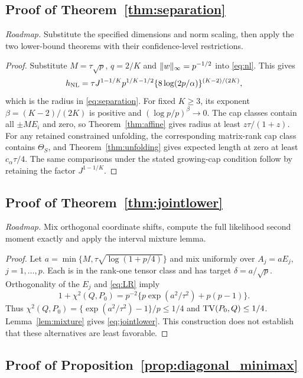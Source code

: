 \subsection{Proof of Theorem~\ref{thm:separation}}


\noindent\emph{Roadmap.} Substitute the specified dimensions and norm scaling, then apply the two lower-bound theorems with their confidence-level restrictions.
\begin{proof}
Substitute $M=\tau\sqrt p$, $q=2/K$ and $\lVert w\rVert_\infty=p^{-1/2}$ into \eqref{eq:nl}. This gives
\[
 h_{\mathrm{NL}}=\tau J^{1-1/K}
 p^{1/K-1/2}\{8\log(2p/\alpha)\}^{(K-2)/(2K)},
\]
which is the radius in \eqref{eq:separation}. For fixed $K\ge3$, its exponent $\beta=(K-2)/(2K)$ is positive and $(\log p/p)^\beta\to0$. The cap classes contain all $\pm M E_i$ and zero, so Theorem~\ref{thm:affine} gives radius at least $z\tau/(1+z)$. For any retained constrained unfolding, the corresponding matrix-rank cap class contains $\Theta_S$, and Theorem~\ref{thm:unfolding} gives expected length at zero at least $c_\alpha\tau/4$. The same comparisons under the stated growing-cap condition follow by retaining the factor $J^{1-1/K}$.
\end{proof}

\subsection{Proof of Theorem~\ref{thm:jointlower}}


\noindent\emph{Roadmap.} Mix orthogonal coordinate shifts, compute the full likelihood second moment exactly and apply the interval mixture lemma.
\begin{proof}
Let $a=\min\{M,\tau\sqrt{\log(1+p/4)}\}$ and mix uniformly over $A_j=aE_j$, $j=1,\ldots,p$. Each is in the rank-one tensor class and has target $\delta=a/\sqrt p$. Orthogonality of the $E_j$ and \eqref{eq:LR} imply
\[
 1+\chi^2(Q,P_0)=p^{-2}\{p\exp(a^2/\tau^2)+p(p-1)\}.
\]
Thus $\chi^2(Q,P_0)=\{\exp(a^2/\tau^2)-1\}/p\le1/4$ and $\operatorname{TV}(P_0,Q)\le1/4$. Lemma~\ref{lem:mixture} gives \eqref{eq:jointlower}. This construction does not establish that these alternatives are least favorable.
\end{proof}


\subsection{Proof of Proposition~\ref{prop:diagonal_minimax}}


